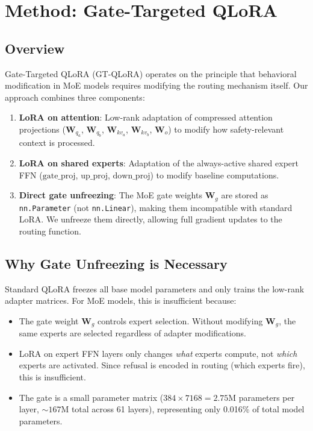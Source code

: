 \documentclass[11pt,a4paper]{article}
\begin{document}
\section{Method: Gate-Targeted QLoRA}

\subsection{Overview}

Gate-Targeted QLoRA (GT-QLoRA) operates on the principle that behavioral modification in MoE models requires modifying the routing mechanism itself. Our approach combines three components:

\begin{enumerate}
    \item \textbf{LoRA on attention}: Low-rank adaptation of compressed attention projections ($\mathbf{W}_{q_a}$, $\mathbf{W}_{q_b}$, $\mathbf{W}_{kv_a}$, $\mathbf{W}_{kv_b}$, $\mathbf{W}_o$) to modify how safety-relevant context is processed.

    \item \textbf{LoRA on shared experts}: Adaptation of the always-active shared expert FFN ($\text{gate\_proj}$, $\text{up\_proj}$, $\text{down\_proj}$) to modify baseline computations.

    \item \textbf{Direct gate unfreezing}: The MoE gate weights $\mathbf{W}_g$ are stored as \texttt{nn.Parameter} (not \texttt{nn.Linear}), making them incompatible with standard LoRA. We unfreeze them directly, allowing full gradient updates to the routing function.
\end{enumerate}

\subsection{Why Gate Unfreezing is Necessary}

Standard QLoRA freezes all base model parameters and only trains the low-rank adapter matrices. For MoE models, this is insufficient because:

\begin{itemize}
    \item The gate weight $\mathbf{W}_g$ controls expert selection. Without modifying $\mathbf{W}_g$, the same experts are selected regardless of adapter modifications.
    \item LoRA on expert FFN layers only changes \textit{what} experts compute, not \textit{which} experts are activated. Since refusal is encoded in routing (which experts fire), this is insufficient.
    \item The gate is a small parameter matrix ($384 \times 7168 = 2.75\text{M}$ parameters per layer, $\sim167\text{M}$ total across 61 layers), representing only 0.016\% of total model parameters.
\end{itemize}
\end{document}
